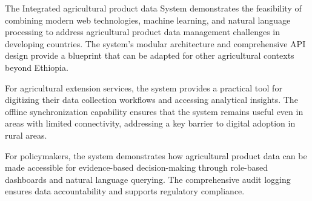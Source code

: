 The Integrated agricultural product data System demonstrates the feasibility of combining modern web technologies, machine learning, and natural language processing to address agricultural product data management challenges in developing countries. The system's modular architecture and comprehensive API design provide a blueprint that can be adapted for other agricultural contexts beyond Ethiopia.

For agricultural extension services, the system provides a practical tool for digitizing their data collection workflows and accessing analytical insights. The offline synchronization capability ensures that the system remains useful even in areas with limited connectivity, addressing a key barrier to digital adoption in rural areas.

For policymakers, the system demonstrates how agricultural product data can be made accessible for evidence-based decision-making through role-based dashboards and natural language querying. The comprehensive audit logging ensures data accountability and supports regulatory compliance.
